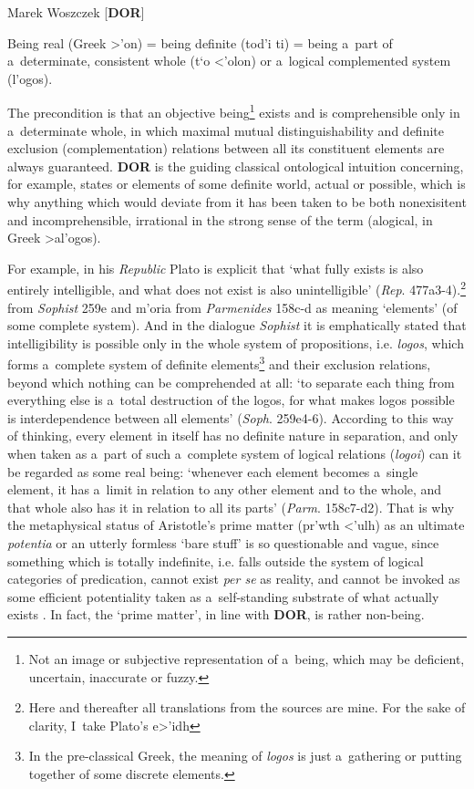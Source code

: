 \begin{artengenv}{Marek Woszczek}
[\textbf{DOR}]

Being real (Greek \textgreek{>'on}) = being definite (\textgreek{tod'i ti}) = being a~part of a~determinate, consistent whole (\textgreek{t`o <'olon}) or a~logical complemented system (\textgreek{l'ogos}).

The precondition is that an objective being\footnote{Not an image or subjective representation of a~being, which may be deficient, uncertain, inaccurate or fuzzy. } exists and is comprehensible only in a~determinate whole, in which maximal mutual distinguishability and definite exclusion (complementation) relations between all its constituent elements are always guaranteed. \textbf{DOR} is the guiding classical ontological intuition concerning, for example, states or elements of some definite world, actual or possible, which is why anything which would deviate from it has been taken to be both nonexisitent and incomprehensible, irrational in the strong sense of the term (alogical, in Greek \textgreek{>al'ogos}).

For example, in his \textit{Republic} Plato is explicit that ‘what fully exists is also entirely intelligible, and what does not exist is also unintelligible' (\textit{Rep}. 477a3-4).\footnote{Here and thereafter all translations from the sources are mine. For the sake of clarity, I~take Plato's \textgreek{e>'idh}} from \textit{Sophist} 259e and \textgreek{m'oria} from \textit{Parmenides} 158c-d as meaning ‘elements' (of some complete system). And in the dialogue \textit{Sophist} it is emphatically stated that intelligibility is possible only in the whole system of propositions, i.e. \textit{logos}, which forms a~complete system of definite elements\footnote{In the pre-classical Greek, the meaning of \textit{logos} is just a~gathering or putting together of some discrete elements.} and their exclusion relations, beyond which nothing can be comprehended at all: ‘to separate each thing from everything else is a~total destruction of the logos, for what makes logos possible is interdependence between all elements' (\textit{Soph}. 259e4-6). According to this way of thinking, every element in itself has no definite nature in separation, and only when taken as a~part of such a~complete system of logical relations (\textit{logoi}) can it be regarded as some real being: ‘whenever each element becomes a~single element, it has a~limit in relation to any other element and to the whole, and that whole also has it in relation to all its parts' (\textit{Parm}. 158c7-d2). That is why the metaphysical status of Aristotle's prime matter (\textgreek{pr'wth <'ulh}) as an ultimate \textit{potentia} or an utterly formless ‘bare stuff' is so questionable and vague, since something which is totally indefinite, i.e. falls outside the system of logical categories of predication, cannot exist \textit{per se} as reality, and cannot be invoked as some efficient potentiality taken as a~self-standing substrate of what actually exists
\parencite[see e.g.][]{aristoteles_appendix_1992}. %
 In fact, the ‘prime matter', in line with \textbf{DOR}, is rather non-being.


\end{artengenv}

